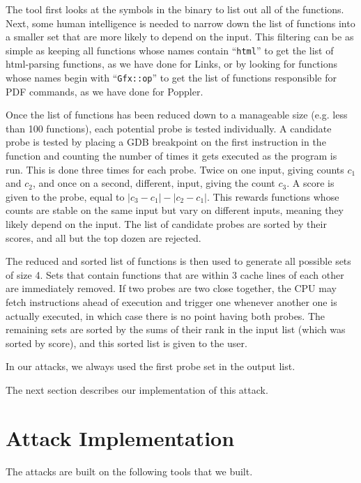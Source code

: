 \documentclass[letterpaper,twocolumn,10pt]{article}
\begin{document}
The tool first looks at the symbols in the binary to list out all of the
functions. Next, some human intelligence is needed to narrow down the list of
functions into a smaller set that are more likely to depend on the input. This
filtering can be as simple as keeping all functions whose names contain
``\texttt{html}'' to get the list of html-parsing functions, as we have done for
Links, or by looking for functions whose names begin with ``\texttt{Gfx::op}''
to get the list of functions responsible for PDF commands, as we have done for
Poppler.

Once the list of functions has been reduced down to a manageable size (e.g. less
than 100 functions), each potential probe is tested individually. A candidate
probe is tested by placing a GDB breakpoint on the first instruction in the
function and counting the number of times it gets executed as the program is
run. This is done three times for each probe. Twice on one input, giving counts
$c_1$ and $c_2$, and once on a second, different, input, giving the count $c_3$.
A score is given to the probe, equal to $|c_3 - c_1| - |c_2 - c_1|$. This
rewards functions whose counts are stable on the same input but vary on
different inputs, meaning they likely depend on the input. The list of candidate
probes are sorted by their scores, and all but the top dozen are rejected.

The reduced and sorted list of functions is then used to generate all possible
sets of size 4. Sets that contain functions that are within 3 cache lines of
each other are immediately removed. If two probes are two close together, the
CPU may fetch instructions ahead of execution and trigger one whenever another
one is actually executed, in which case there is no point having both probes.
The remaining sets are sorted by the sums of their rank in the input list (which
was sorted by score), and this sorted list is given to the user.

In our attacks, we always used the first probe set in the output list.

The next section describes our implementation of this attack.

\section{Attack Implementation}
\label{sec:implementation}

The attacks are built on the following tools that we built.
\end{document}
